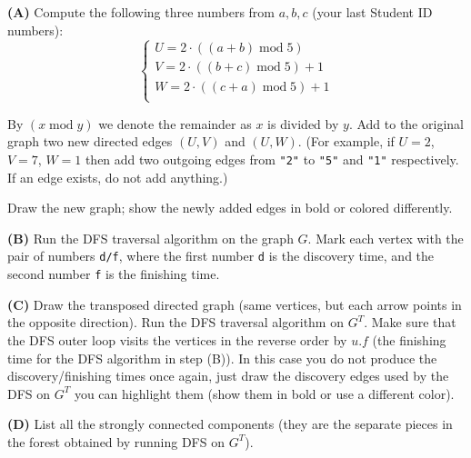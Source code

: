 \documentclass[a4paper,12pt]{article}
\begin{document}
\vspace{10pt}
{\bf (A)} Compute the following three numbers from $a,b,c$ (your last 
Student ID numbers): 
$$\left\{ \begin{array}{l}
U = 2 \cdot ((a+b)\;\text{mod}\;5)\\
V = 2 \cdot ((b+c)\;\text{mod}\;5)+1\\
W = 2 \cdot ((c+a)\;\text{mod}\;5)+1\\
\end{array} \right.$$

By $(x\;\text{mod}\;y)$ we denote the remainder as $x$ is divided by $y$. 
Add to the original graph two new directed edges $(U,V)$ and $(U,W)$. 
(For example, if $U = 2$, $V = 7$, $W = 1$ then add two outgoing edges from 
{\tt "2"} to {\tt "5"} and {\tt "1"} respectively. If an edge exists, do 
not add anything.)

Draw the new graph; show the newly added edges in bold or colored differently.

\vspace{10pt}
{\bf (B)} Run the DFS traversal algorithm on the graph $G$. 
Mark each vertex 
with the pair of numbers {\tt d/f}, where the first number {\tt d} is the 
discovery time, and the second number {\tt f} is the finishing time. 

\vspace{10pt}
{\bf (C)} Draw the transposed directed graph (same vertices, but each arrow points
in the opposite direction). 
Run the DFS traversal algorithm on $G^T$. Make sure that the DFS 
outer loop visits the vertices in the reverse order by $u.f$ 
(the finishing time for the DFS algorithm in step (B)). 
In this case you do not produce the discovery/finishing times once again, 
just draw the discovery edges used by the DFS on $G^T$ \textendash{}
you can highlight them (show them in bold or use a different color). 

\vspace{10pt}
{\bf (D)} List all the strongly connected components (they are 
the separate pieces in the forest obtained by running DFS 
on $G^T$). 
\end{document}
